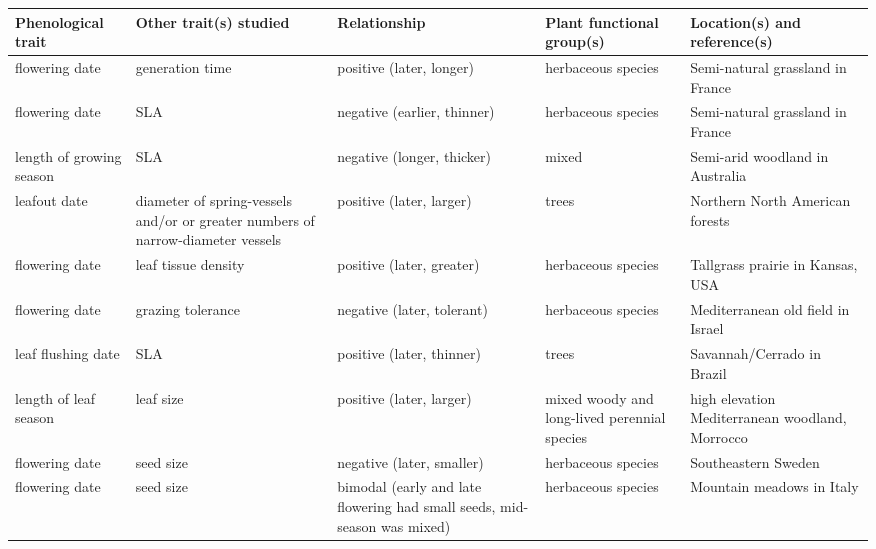 \documentclass[11pt,a4paper,oneside]{article}
\begin{document}
\begin{center}  
\begin{table}
\vspace{1.5 pt}
\begin{minipage}{16cm}
\begin{tabular}{ | p{2cm} |  p{2.5 cm} | p{2.5 cm} | p{2.5 cm} | p{5cm} | }  \hline
Phenological trait & Other trait(s) studied  & Relationship & Plant functional group(s) & Location(s) and reference(s) \\ \hline \hline
flowering date	& generation time & positive (later, longer) & herbaceous species & Semi-natural grassland in France \citep{Vile:2006nc} \\ \hline
flowering date	& SLA & negative (earlier, thinner) & herbaceous species & Semi-natural grassland in France \citep{Vile:2006nc} \\ \hline
length of growing season & SLA & negative (longer, thicker) & mixed & Semi-arid woodland in Australia \citep{Campanella2008} \\ \hline
leafout date & diameter of spring-vessels and/or or greater numbers of narrow-diameter vessels & positive (later, larger)  & trees & Northern North American forests \citep{Lechowicz:1984cr}\\ \hline
flowering date & leaf tissue density & positive (later, greater) & herbaceous species & Tallgrass prairie in Kansas, USA \citep{Craine:2012kl}\\ \hline
flowering date & grazing tolerance & negative (later, tolerant) & herbaceous species & Mediterranean old field in Israel \citep{hadar1999}  \\ \hline \hline
leaf flushing date & SLA & positive (later, thinner) & trees & Savannah/Cerrado in Brazil \citep{Rossatto2009} \\ \hline
length of leaf season & leaf size & positive (later, larger) & mixed woody and long-lived perennial species & high elevation Mediterranean woodland, Morrocco \citep{Navarro2010}\\ \hline
flowering date & seed size & negative (later, smaller) & herbaceous species & Southeastern Sweden \citep{Bolmgren:2008vo}\\ \hline
flowering date & seed size & bimodal (early and late flowering had small seeds, mid-season was mixed) & herbaceous species & Mountain meadows in Italy \citep{Catorci2012} \\ \hline	

\end{tabular}
\end{minipage}
\end{table}
\end{center}
\end{document}
